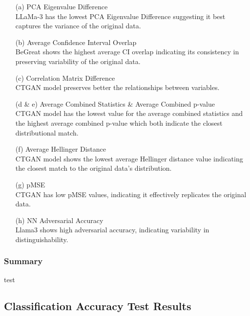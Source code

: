 \begin{enumerate}
    \item[(a)] PCA Eigenvalue Difference \\
    LLaMa-3 has the lowest PCA Eigenvalue Difference suggesting it best captures the variance of the original data. 

    \item[(b)] Average Confidence Interval Overlap \\
    BeGreat shows the highest average CI overlap indicating its consistency in preserving variability of the original data.

    \item[(c)] Correlation Matrix Difference \\
    CTGAN model preserves better the relationships between variables.

    \item[(d \& e)] Average Combined Statistics \& Average Combined p-value \\
    CTGAN model has the lowest value for the average combined statistics and the highest average combined p-value which both indicate the closest distributional match.

    \item[(f)] Average Hellinger Distance \\
    CTGAN model shows the lowest average Hellinger distance value indicating the closest match to the original data’s distribution.

    \item[(g)] pMSE \\
    CTGAN has low pMSE values, indicating it effectively replicates the original data.

    \item[(h)] NN Adversarial Accuracy \\
    Llama3 shows high adversarial accuracy, indicating variability in distinguishability.
\end{enumerate}

\subsubsection{Summary}

test


\subsection{Classification Accuracy Test Results}

